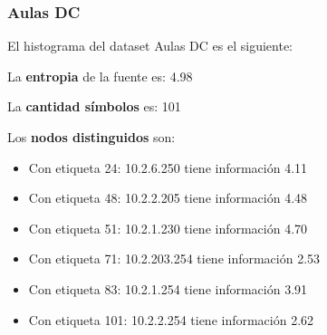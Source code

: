\subsubsection{Aulas DC}

El histograma del dataset Aulas DC es el siguiente:

\begin{center}
\end{center}


La \textbf{entropia} de la fuente es: 4.98

La \textbf{cantidad símbolos} es: 101

Los \textbf{nodos distinguidos} son:

\begin{itemize}
    \item Con etiqueta 24: 10.2.6.250 tiene información 4.11
    \item Con etiqueta 48: 10.2.2.205 tiene información 4.48
    \item Con etiqueta 51: 10.2.1.230 tiene información 4.70
    \item Con etiqueta 71: 10.2.203.254 tiene información 2.53
    \item Con etiqueta 83: 10.2.1.254 tiene información 3.91
    \item Con etiqueta 101: 10.2.2.254 tiene información 2.62
\end{itemize}

